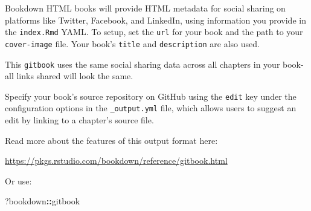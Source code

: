 \documentclass[
]{book}
\newenvironment{Shaded}{\begin{snugshade}}{\end{snugshade}}
\newcommand{\NormalTok}[1]{#1}
\newcommand{\SpecialCharTok}[1]{\textcolor[rgb]{0.81,0.36,0.00}{\textbf{#1}}}
\theoremstyle{definition}
\theoremstyle{definition}
\theoremstyle{definition}
\theoremstyle{definition}
\theoremstyle{remark}
\begin{document}
Bookdown HTML books will provide HTML metadata for social sharing on platforms like Twitter, Facebook, and LinkedIn, using information you provide in the \texttt{index.Rmd} YAML. To setup, set the \texttt{url} for your book and the path to your \texttt{cover-image} file. Your book's \texttt{title} and \texttt{description} are also used.

This \texttt{gitbook} uses the same social sharing data across all chapters in your book- all links shared will look the same.

Specify your book's source repository on GitHub using the \texttt{edit} key under the configuration options in the \texttt{\_output.yml} file, which allows users to suggest an edit by linking to a chapter's source file.

Read more about the features of this output format here:

\url{https://pkgs.rstudio.com/bookdown/reference/gitbook.html}

Or use:

\begin{Shaded}
\begin{Highlighting}[]
\NormalTok{?bookdown}\SpecialCharTok{::}\NormalTok{gitbook}
\end{Highlighting}
\end{Shaded}


  
\end{document}
